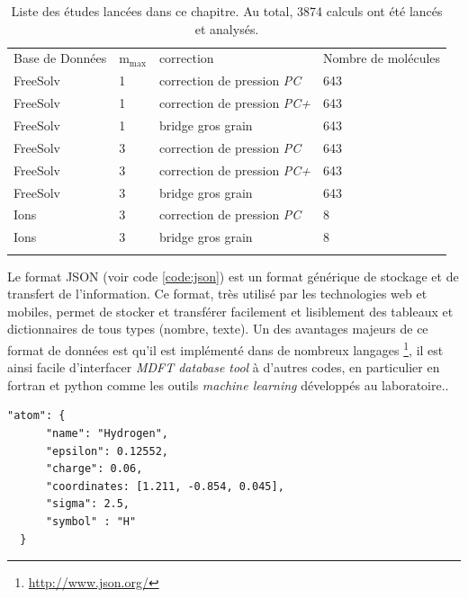 \begin{table}[H]
  \begin{tabular}{ l l l l }
    \hline & \\[-1em]\hline
    Base de Données & $\mathrm{m}_\mathrm{max}$   & correction & Nombre de molécules \\
    \hline
    FreeSolv  & 1 & correction de pression \textit{PC} & 643 \\
    FreeSolv  & 1 & correction de pression \textit{PC+} & 643 \\
    FreeSolv  & 1 & bridge gros grain & 643 \\
    FreeSolv  & 3 & correction de pression \textit{PC} & 643 \\
    FreeSolv  & 3 & correction de pression \textit{PC+} & 643 \\
    FreeSolv  & 3 & bridge gros grain & 643 \\
    \hline
    Ions  & 3 & correction de pression \textit{PC} & 8 \\
    Ions  & 3 & bridge gros grain & 8 \\
    \hline & \\[-1em]\hline
  \end{tabular}
  \caption{Liste des études lancées dans ce chapitre. Au total, 3874 calculs ont été lancés et analysés.}
  \label{tab:calculs_lances}  
\end{table}



Le format JSON (voir code \ref{code:json}) est un format générique de stockage et de transfert de l'information. Ce format, très utilisé par les technologies web et mobiles, permet de stocker et transférer facilement et lisiblement des tableaux et dictionnaires de tous types (nombre, texte). Un des avantages majeurs de ce format de données est qu'il est implémenté dans de nombreux langages \footnote{\url{http://www.json.org/}}, il est ainsi facile d'interfacer \textit{MDFT database tool} à d'autres codes, en particulier en fortran et python comme les outils \textit{machine learning} développés au laboratoire.. 

\begin{lstlisting}[caption={Exemple de fichier json. Ici on décrit un atome, son nom, son symbole, sa position ainsi que ses paramètres de champs de force.}, label={code:json},captionpos=b]
  "atom": {
      "name": "Hydrogen", 
      "epsilon": 0.12552, 
      "charge": 0.06, 
      "coordinates: [1.211, -0.854, 0.045],  
      "sigma": 2.5,
      "symbol" : "H"
  }
\end{lstlisting}





